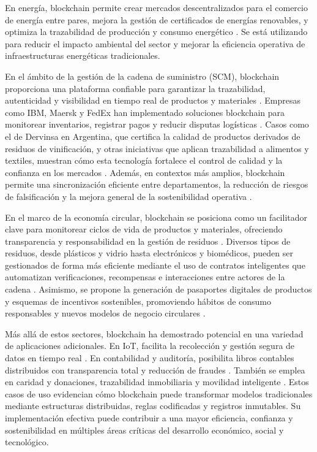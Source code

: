 En energía, blockchain permite crear mercados descentralizados para el comercio de energía entre pares, mejora la gestión de certificados de energías renovables, y optimiza la trazabilidad de producción y consumo energético \cite{sunny2022systematic, vaigandla2023review}. Se está utilizando para reducir el impacto ambiental del sector y mejorar la eficiencia operativa de infraestructuras energéticas tradicionales.

En el ámbito de la gestión de la cadena de suministro (SCM), blockchain proporciona una plataforma confiable para garantizar la trazabilidad, autenticidad y visibilidad en tiempo real de productos y materiales \cite{torres2022tendencias, sharabati2024blockchain}. Empresas como IBM, Maersk y FedEx han implementado soluciones blockchain para monitorear inventarios, registrar pagos y reducir disputas logísticas \cite{tripathi2023comprehensive}. Casos como el de Dervinsa en Argentina, que certifica la calidad de productos derivados de residuos de vinificación, y otras iniciativas que aplican trazabilidad a alimentos y textiles, muestran cómo esta tecnología fortalece el control de calidad y la confianza en los mercados \cite{bartolomeo2020introduccion}. Además, en contextos más amplios, blockchain permite una sincronización eficiente entre departamentos, la reducción de riesgos de falsificación y la mejora general de la sostenibilidad operativa \cite{sunny2022systematic}.

En el marco de la economía circular, blockchain se posiciona como un facilitador clave para monitorear ciclos de vida de productos y materiales, ofreciendo transparencia y responsabilidad en la gestión de residuos \cite{bulkowska2023implementation, baralla2023waste}. Diversos tipos de residuos, desde plásticos y vidrio hasta electrónicos y biomédicos, pueden ser gestionados de forma más eficiente mediante el uso de contratos inteligentes que automatizan verificaciones, recompensas e interacciones entre actores de la cadena \cite{baralla2023waste}. Asimismo, se propone la generación de pasaportes digitales de productos y esquemas de incentivos sostenibles, promoviendo hábitos de consumo responsables y nuevos modelos de negocio circulares \cite{baralla2023waste}.

Más allá de estos sectores, blockchain ha demostrado potencial en una variedad de aplicaciones adicionales. En IoT, facilita la recolección y gestión segura de datos en tiempo real \cite{sunny2022systematic}. En contabilidad y auditoría, posibilita libros contables distribuidos con transparencia total y reducción de fraudes \cite{bartolomeo2020introduccion}. También se emplea en caridad y donaciones, trazabilidad inmobiliaria y movilidad inteligente \cite{bartolomeo2020introduccion}. Estos casos de uso evidencian cómo blockchain puede transformar modelos tradicionales mediante estructuras distribuidas, reglas codificadas y registros inmutables. Su implementación efectiva puede contribuir a una mayor eficiencia, confianza y sostenibilidad en múltiples áreas críticas del desarrollo económico, social y tecnológico.

